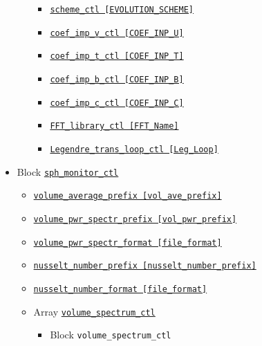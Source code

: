 \begin{itemize}
\begin{itemize}
\begin{itemize}
		\item \hyperref[href_t:scheme_ctl]{\tt scheme\_ctl              [EVOLUTION\_SCHEME]}
		\item \hyperref[href_t:coef_imp_v_ctl]{\tt coef\_imp\_v\_ctl    [COEF\_INP\_U]}
		\item \hyperref[href_t:coef_imp_t_ctl]{\tt coef\_imp\_t\_ctl    [COEF\_INP\_T]}
		\item \hyperref[href_t:coef_imp_b_ctl]{\tt coef\_imp\_b\_ctl    [COEF\_INP\_B]}
		\item \hyperref[href_t:coef_imp_c_ctl]{\tt coef\_imp\_c\_ctl    [COEF\_INP\_C]}
		\item \hyperref[href_t:FFT_library_ctl]{\tt FFT\_library\_ctl   [FFT\_Name]}
		\item \hyperref[href_t:Legendre_trans_loop_ctl]
			{\tt Legendre\_trans\_loop\_ctl [Leg\_Loop]}
		\end{itemize}
%
	\end{itemize}
%
\item Block \hyperref[href_t:sph_monitor_ctl]{\tt sph\_monitor\_ctl}
	\begin{itemize} \label{href_i:sph_monitor_ctl}
	\item \hyperref[href_t:volume_average_prefix]
			{\tt volume\_average\_prefix        [vol\_ave\_prefix]}
	\item \hyperref[href_t:volume_pwr_spectr_prefix]
			{\tt volume\_pwr\_spectr\_prefix    [vol\_pwr\_prefix]}
	\item \hyperref[href_t:volume_pwr_spectr_format]
			{\tt volume\_pwr\_spectr\_format    [file\_format]}
%
	\item \hyperref[href_t:nusselt_number_prefix]
			{\tt nusselt\_number\_prefix        [nusselt\_number\_prefix]}
	\item \hyperref[href_t:nusselt_number_format]
			{\tt nusselt\_number\_format    [file\_format]}
%
	\item Array \hyperref[href_t:volume_spectrum_ctl]{\tt volume\_spectrum\_ctl}
		\begin{itemize}
		\item Block \verb|volume_spectrum_ctl|
\end{itemize}
\end{itemize}
\end{itemize}
